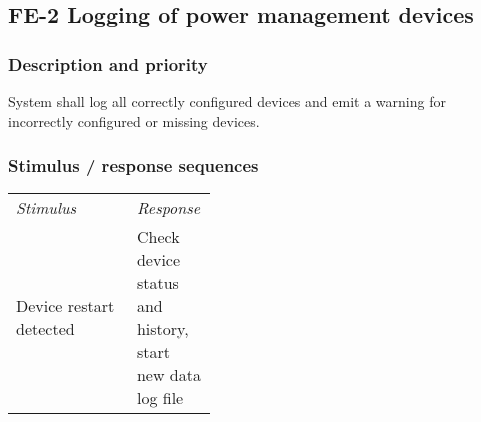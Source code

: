 \documentclass[pdftex,oneside,12pt,a4paper]{book}
\begin{document}
\subsection{FE-2 Logging of power management devices}
\subsubsection{Description and priority}
System shall log all correctly configured devices and emit a warning for incorrectly configured or missing devices.

\subsubsection{Stimulus / response sequences}
\begin{tabular}{lp{0.4\linewidth}}
\emph{Stimulus} & \emph{Response}\\
Device restart detected & Check device status and history, start new data log file \\
\end{tabular}
\end{document}
